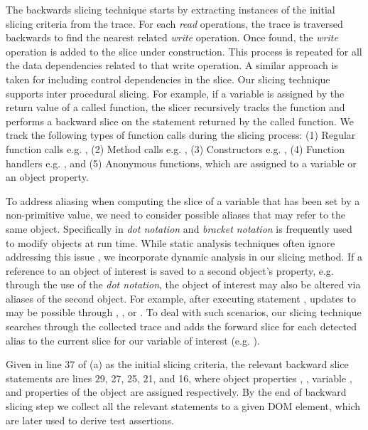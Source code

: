 The backwards slicing technique starts by extracting instances of the initial slicing criteria from the trace. For each \textit{read} operations, the trace is traversed backwards to find the nearest related \textit{write} operation. Once found, the \textit{write} operation is added to the slice under construction. This process is repeated for all the data dependencies related to that write operation. A similar approach is taken for including control dependencies in the slice. 
Our slicing technique supports inter procedural slicing. For example, if a variable is assigned by the return value of a called function, the slicer recursively tracks the function and performs a backward slice on the statement returned by the called function.
We track the following types of function calls during the slicing process: (1) Regular function calls e.g. , (2) Method calls e.g. ,
(3) Constructors e.g. , (4) Function handlers e.g. , 
and (5) Anonymous functions, which are assigned to a variable or an object property.
  
To address aliasing when computing the slice of a variable that has been set by a non-primitive value, we need to consider possible aliases that may refer to the same object. Specifically in \javascript \textit{dot notation} and \textit{bracket notation} is frequently used to modify objects at run time. While static analysis techniques often ignore addressing this issue \cite{Feldthaus:icse13}, we incorporate dynamic analysis in our slicing method. If a reference to an object of interest is saved to a second object's property, e.g. through the use of the \textit{dot notation}, the object of interest may also be altered via aliases of the second object. For example, after executing statement , updates to  may be possible through , , or . To deal with such scenarios, our slicing technique searches through the collected trace and adds the forward slice for each detected alias to the current slice for our variable of interest (e.g. ). 

Given  in line 37 of (a) as the initial slicing criteria, the relevant backward slice statements are lines 29, 27, 25, 21, and 16, where object properties , , variable , and properties of the object  are assigned respectively.
By the end of backward slicing step we collect all the relevant statements to a given DOM element, which are later used to derive test assertions.    